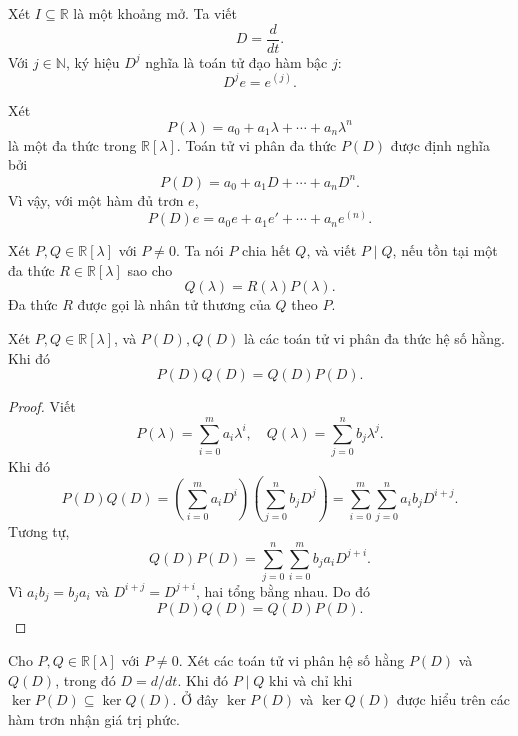 ﻿\documentclass[12pt]{article}
\begin{document}
Xét $I \subseteq\mathbb R$ là một khoảng mở. Ta viết
\[
 D = \frac{d}{dt}.
\]
Với $j \in \mathbb N$, ký hiệu $D^j$ nghĩa là toán tử đạo hàm bậc $j$:
\[
 D^j e = e^{(j)}.
\]

\begin{definition}
Xét
\[
 P(\lambda) = a_0 + a_1\lambda + \cdots + a_n\lambda^n
\]
là một đa thức trong $\mathbb R[\lambda]$. Toán tử vi phân đa thức $P(D)$ được định nghĩa bởi
\[
 P(D) = a_0 + a_1D + \cdots + a_nD^n.
\]
Vì vậy, với một hàm đủ trơn $e$,
\[
 P(D)e
 =
 a_0e + a_1e' + \cdots + a_ne^{(n)}.
\]
\end{definition}

\begin{definition}
Xét $P, Q \in \mathbb R[\lambda]$ với $P \neq 0$. Ta nói $P$ chia hết $Q$, và viết $P \mid Q$, nếu tồn tại một đa thức $R \in \mathbb R[\lambda]$ sao cho
\[
 Q(\lambda) = R(\lambda)P(\lambda).
\]
Đa thức $R$ được gọi là nhân tử thương của $Q$ theo $P$.
\end{definition}
\begin{lemma}\label{lem:operator-commutativity}
Xét $P, Q \in \mathbb R[\lambda]$, và $P(D), Q(D)$ là các toán tử vi phân đa thức hệ số hằng. Khi đó
\[
 P(D)Q(D) = Q(D)P(D).
\]
\end{lemma}

\begin{proof}
Viết
\[
 P(\lambda) = \sum_{i = 0}^m a_i\lambda^i,
 \quad
 Q(\lambda) = \sum_{j = 0}^n b_j\lambda^j.
\]
Khi đó
\[
 P(D)Q(D)
 =
 \left(\sum_{i = 0}^m a_iD^i\right)
 \left(\sum_{j = 0}^n b_jD^j\right)
 =
 \sum_{i = 0}^m\sum_{j = 0}^n a_ib_jD^{i + j}.
\]
Tương tự,
\[
 Q(D)P(D)
 =
 \sum_{j = 0}^n\sum_{i = 0}^m b_ja_iD^{j + i}.
\]
Vì $a_ib_j = b_ja_i$ và $D^{i + j} = D^{j + i}$, hai tổng bằng nhau. Do đó
\[
 P(D)Q(D) = Q(D)P(D).
\]
\end{proof}

\begin{lemma}\label{lem:operator-kernel-inclusion}
Cho $P, Q \in \mathbb R[\lambda]$ với $P \neq 0$.
Xét các toán tử vi phân hệ số hằng $P(D)$ và $Q(D)$, trong đó $D = d/dt$.
Khi đó
$P \mid Q$ khi và chỉ khi $\ker P(D) \subseteq \ker Q(D)$. Ở đây $\ker P(D)$ và $\ker Q(D)$ được hiểu trên các hàm trơn nhận giá trị phức.

\end{lemma}
\end{document}
